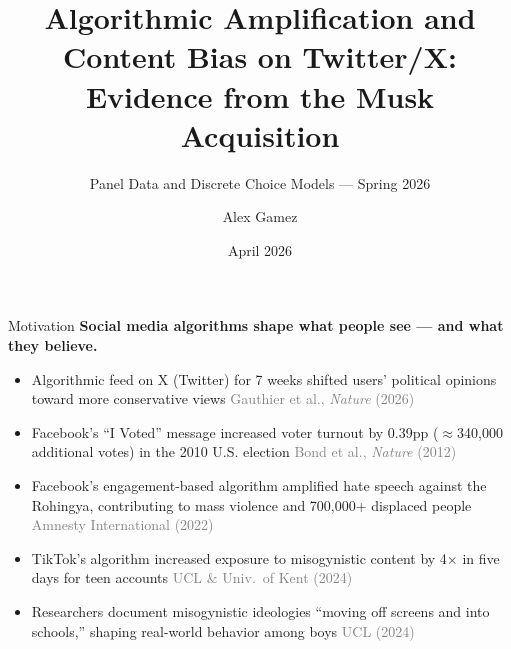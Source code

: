 \documentclass[aspectratio=169]{beamer}
\title[Twitter Algorithmic Bias]{Algorithmic Amplification and Content Bias on Twitter/X:\\
\small Evidence from the Musk Acquisition}
\subtitle{Panel Data and Discrete Choice Models --- Spring 2026}
\author{Alex Gamez}
\institute{The University of Texas at El Paso}
\date{April 2026}
\begin{document}
\begin{frame}
\titlepage
\end{frame}

\begin{frame}{Motivation}
\textbf{Social media algorithms shape what people see --- and what they believe.}
\vspace{0.5em}
\begin{itemize}
    \item Algorithmic feed on X (Twitter) for 7 weeks shifted users' political opinions toward more conservative views \hfill \textcolor{gray}{\small Gauthier et al., \textit{Nature} (2026)}
    \vspace{0.3em}
    \item Facebook's ``I Voted'' message increased voter turnout by 0.39pp ($\approx$340,000 additional votes) in the 2010 U.S. election \hfill \textcolor{gray}{\small Bond et al., \textit{Nature} (2012)}
    \vspace{0.3em}
    \item Facebook's engagement-based algorithm amplified hate speech against the Rohingya, contributing to mass violence and 700,000+ displaced people \hfill \textcolor{gray}{\small Amnesty International (2022)}
    \vspace{0.3em}
    \item TikTok's algorithm increased exposure to misogynistic content by 4$\times$ in five days for teen accounts \hfill \textcolor{gray}{\small UCL \& Univ.\ of Kent (2024)}
    \vspace{0.3em}
    \item Researchers document misogynistic ideologies ``moving off screens and into schools,'' shaping real-world behavior among boys \hfill \textcolor{gray}{\small UCL (2024)}
\end{itemize}
\end{frame}
\end{document}
